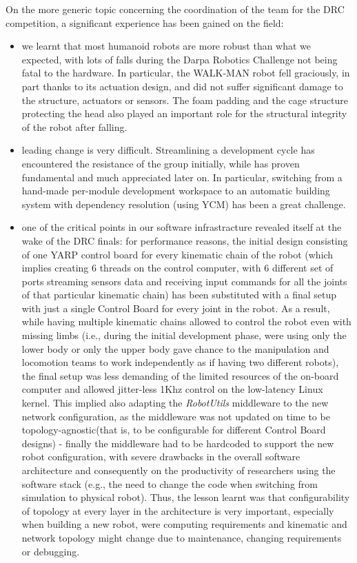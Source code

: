 \documentclass[%
	paper=A4,					%
	twoside=true,				%
	openright,			.
	parskip=full,				%
	chapterprefix=true,			%
	11pt,						%
	headings=normal,			%
	bibliography=totoc,			%
	listof=totoc,				%
	titlepage=on,				%
	captions=tableabove,		%
	draft=false,				%
]{scrreprt}%
\begin{document}
On the more generic topic concerning the coordination of the team for the DRC competition, a significant experience has been gained on the field:
\begin{itemize}
 \item we learnt that most humanoid robots are more robust than what we expected, with lots of falls during the Darpa Robotics Challenge not being fatal to the hardware. In particular, the WALK-MAN robot fell graciously, in part thanks to its actuation design, and did not suffer significant damage to the structure, actuators or sensors. The foam padding and the cage structure protecting the head also played an important role for the structural integrity of the robot after falling.
 \item leading change is very difficult. Streamlining a development cycle has encountered the resistance of the group initially, while has proven fundamental and much appreciated later on. In particular, switching from a hand-made per-module development workspace to an automatic building system with dependency resolution (using YCM) has been a great challenge.
 \item one of the critical points in our software infrastracture revealed itself at the wake of the DRC finals: for performance reasons, the initial design consisting of one YARP control board for every kinematic chain of the robot (which implies creating 6 threads on the control computer, with 6 different set of ports streaming sensors data and receiving input commands for all the joints of that particular kinematic chain) has been substituted with a final setup with just a single Control Board for every joint in the robot. As a result, while having multiple kinematic chains allowed to control the robot even with missing limbs (i.e., during the initial development phase, were using only the lower body or only the upper body gave chance to the manipulation and locomotion teams to work independently as if having two different robots), the final setup was less demanding of the limited resources of the on-board computer and allowed jitter-less 1Khz control on the low-latency Linux kernel. This implied also adapting the \emph{RobotUtils} middleware to the new network configuration, as the middleware was not updated on time to be topology-agnostic(that is, to be configurable for different Control Board designs) - finally the middleware had to be hardcoded to support the new robot configuration, with severe drawbacks in the overall software architecture and consequently on the productivity of researchers using the software stack (e.g., the need to change the code when switching from simulation to physical robot). Thus, the lesson learnt was that configurability of topology at every layer in the architecture is very important, especially when building a new robot, were computing requirements and kinematic and network topology might change due to maintenance, changing requirements or debugging.
\end{itemize}
\end{document}
